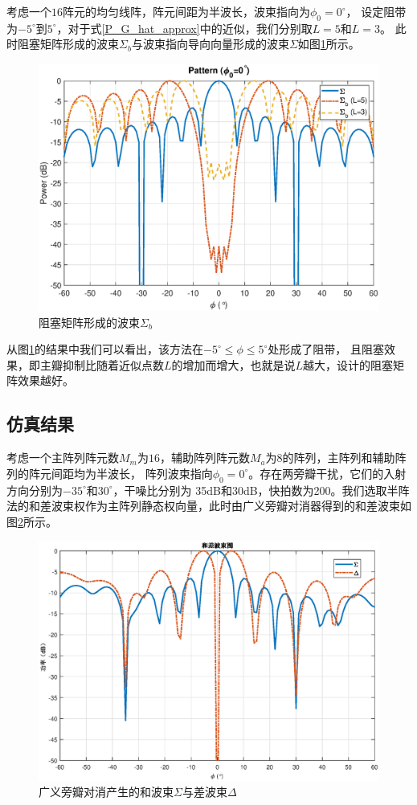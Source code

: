 \documentclass[master]{thesis-uestc}
\begin{document}
考虑一个$16$阵元的均匀线阵，阵元间距为半波长，波束指向为$\phi_0=0^\circ$，
设定阻带为$-5^\circ$到$5^\circ$，对于式\eqref{P_G_hat_approx}中的近似，我们分别取$L=5$和$L=3$。
此时阻塞矩阵形成的波束$\Sigma_b$与波束指向导向向量形成的波束$\Sigma$如图\ref{GSC_Block_dif_L}所示。
\begin{figure}[H]
    \includegraphics[scale=0.5]{pic/GSC_Block.eps}
    \caption{阻塞矩阵形成的波束$\Sigma_b$}
    \label{GSC_Block_dif_L}
\end{figure}

从图\ref{GSC_Block_dif_L}的结果中我们可以看出，该方法在$-5^\circ\le\phi\le5^\circ$处形成了阻带，
且阻塞效果，即主瓣抑制比随着近似点数$L$的增加而增大，也就是说$L$越大，设计的阻塞矩阵效果越好。

\subsection{仿真结果}
考虑一个主阵列阵元数$M_m$为$16$，辅助阵列阵元数$M_a$为$8$的阵列，主阵列和辅助阵列的阵元间距均为半波长，
阵列波束指向$\phi_0=0^\circ$。存在两旁瓣干扰，它们的入射方向分别为$-35^\circ$和$30^\circ$，干噪比分别为
35dB和30dB，快拍数为200。我们选取半阵法的和差波束权作为主阵列静态权向量，此时由广义旁瓣对消器得到的和差波束如
图\ref{GSC_sigma_delta}所示。
\begin{figure}[H]
    \includegraphics[scale=0.5]{pic/GSC_sigma_delta.eps}
    \caption{广义旁瓣对消产生的和波束$\Sigma$与差波束$\Delta$}
    \label{GSC_sigma_delta}
\end{figure}
\end{document}
